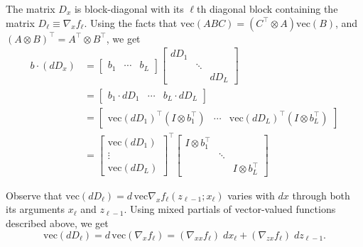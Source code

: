 \documentclass{article}
\begin{document}
The matrix $D_x$ is block-diagonal with its $\ell$th diagonal block containing the matrix $D_\ell \equiv \nabla_x
  f_\ell$. Using the facts that $\mathrm{vec}(ABC) = \left(C^\top \otimes A \right) \mathrm{vec}(B)$, and $(A\otimes
  B)^\top = A^\top \otimes B^\top$, we get
\begin{align}
  b\cdot (dD_x) & =
  \begin{bmatrix}
    b_1 & \cdots & b_L
  \end{bmatrix}
  \begin{bmatrix}
    dD_1 &        &      \\
         & \ddots &      \\
         &        & dD_L
  \end{bmatrix}
  \nonumber         \\
                & =
  \begin{bmatrix}
    b_1 \cdot dD_1 & \cdots & b_L \cdot dD_L
  \end{bmatrix}
  \nonumber         \\
                & =
  \begin{bmatrix}
    \mathrm{vec}\left(dD_1\right)^\top \left(I \otimes b_1^\top\right) &
    \cdots                                                             &
    \mathrm{vec}\left(dD_L\right)^\top \left(I \otimes b_L^\top\right)
  \end{bmatrix}
  \nonumber         \\
                & =
  \begin{bmatrix}
    \mathrm{vec}\left(dD_1\right) \\
    \vdots                        \\
    \mathrm{vec}\left(dD_L\right)
  \end{bmatrix}
  ^\top
  \begin{bmatrix}
    I \otimes b_1^\top &        &                    \\
                       & \ddots &                    \\
                       &        & I \otimes b_L^\top
  \end{bmatrix}
\end{align}

Observe that $\mathrm{vec}\left(dD_\ell\right) = d\,\mathrm{vec} \nabla_x f_\ell(z_{\ell-1}; x_\ell)$ varies with $dx$
through both its arguments $x_\ell$ and $z_{\ell-1}$. Using mixed partials of vector-valued functions described above,
we get
\begin{equation}
  \mathrm{vec} \left(dD_\ell\right) = d\,\mathrm{vec}\left(\nabla_x f_\ell\right) = \left(\nabla_{xx} f_\ell\right)\; dx_\ell  + \left(\nabla_{zx} f_\ell\right)\; dz_{\ell-1}.
\end{equation}
\end{document}
